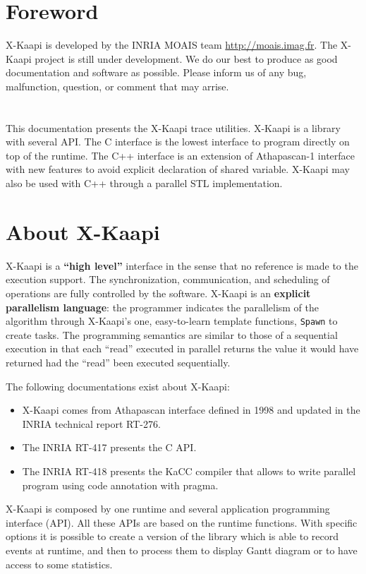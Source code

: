 \documentclass{article}[12pt]
\newcommand{\kaapi}{\textsc{X}-Kaapi\xspace}
\begin{document}
\RRtitle{\kaapi tracing tool}
\RRabstract{}
\RRresume{}
\RRmotcle{}
\RRkeyword{}
\RCGrenoble
\RRNo{}

\makeRT %

\newpage
\tableofcontents
\newpage

\section*{Foreword}
\kaapi is developed by the INRIA MOAIS team \url{http://moais.imag.fr}.
 The \kaapi project is still under development.  We do our best to produce as good documentation and  software as possible.  
 Please inform us of any bug, malfunction, question, or comment that may arrise. \\ 
~\\
~\\
This documentation presents the \kaapi trace utilities. \kaapi is a library with several API. 
The C interface is the lowest interface to program directly on top of the runtime. The C++ interface is an extension of Athapascan-1 interface with new features to avoid explicit declaration of shared variable. \kaapi may also be used with C++ through a parallel STL implementation.

\newpage

\section*{About \kaapi}

\kaapi  is a \textbf{``high level''}  interface in the sense that no reference is made to the execution support.  
The synchronization, communication, and scheduling of operations are fully controlled by the software. 
   \kaapi is an  \textbf{explicit parallelism language}: the programmer indicates the parallelism of the algorithm through \kaapi's one, easy-to-learn  template functions, \texttt{Spawn} to create tasks.   The programming semantics are similar to those of a sequential 
 execution in that each ``read'' executed in parallel returns the value it would have returned had the ``read'' been executed  sequentially. 
 
The following documentations exist about \kaapi:
\begin{itemize}
\item \kaapi comes from Athapascan interface defined in 1998 and updated in the INRIA technical report RT-276. 
\item The INRIA RT-417 presents the C API.
\item The INRIA RT-418 presents the KaCC compiler that allows to write parallel program using code annotation with pragma.
\end{itemize}
\kaapi is composed by one runtime and several application programming interface (API).
All these APIs are based on the runtime functions. With specific options it is possible to create a version of the library which is able to record events at runtime, and then to process them to display Gantt diagram or to have access to some statistics.
\end{document}
